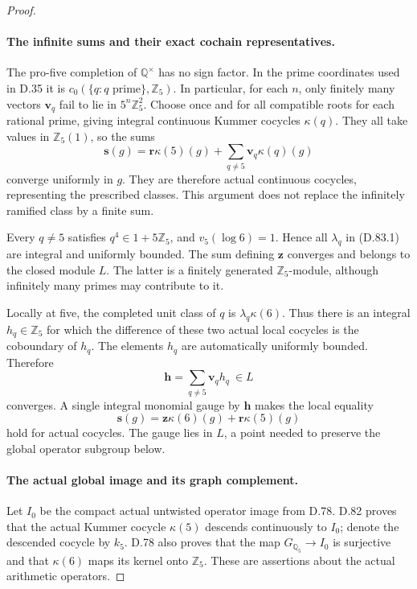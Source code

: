 \begin{proof}
\paragraph{The infinite sums and their exact cochain representatives.}
The pro-five completion of \(\mathbb Q^\times\) has no sign factor.
In the prime coordinates used in D.35 it is
\(c_0(\{q:q\text{ prime}\},\mathbb Z_5)\). In particular, for
each \(n\), only finitely many vectors \(\mathbf v_q\) fail to
lie in \(5^n\mathbb Z_5^2\). Choose once and for all compatible
roots for each rational prime, giving integral continuous
Kummer cocycles \(\kappa(q)\). They all take values in
\(\mathbb Z_5(1)\), so the sums
\[
 \mathbf s(g)=\mathbf r\kappa(5)(g)
           +\sum_{q\ne5}\mathbf v_q\kappa(q)(g)                 \tag{D.83.7}
\]
converge uniformly in \(g\). They are therefore actual continuous
cocycles, representing the prescribed classes. This argument
does not replace the infinitely ramified class by a finite sum.

Every \(q\ne5\) satisfies \(q^4\in1+5\mathbb Z_5\), and
\(v_5(\log6)=1\). Hence all \(\lambda_q\) in (D.83.1)
are integral and uniformly bounded. The sum defining
\(\mathbf z\) converges and belongs to the closed module \(L\).
The latter is a finitely generated \(\mathbb Z_5\)-module,
although infinitely many primes may contribute to it.

Locally at five, the completed unit class of \(q\) is
\(\lambda_q\kappa(6)\). Thus there is an integral
\(h_q\in\mathbb Z_5\) for which the difference of these two
actual local cocycles is the coboundary of \(h_q\).
The elements \(h_q\) are automatically uniformly bounded.
Therefore
\[
                       \mathbf h=\sum_{q\ne5}\mathbf v_qh_q
                                  \ \in L                       \tag{D.83.8}
\]
converges. A single integral monomial gauge by \(\mathbf h\)
makes the local equality
\[
              \mathbf s(g)=\mathbf z\kappa(6)(g)
                                +\mathbf r\kappa(5)(g)          \tag{D.83.9}
\]
hold for actual cocycles. The gauge lies in \(L\), a point
needed to preserve the global operator subgroup below.

\paragraph{The actual global image and its graph complement.}
Let \(I_0\) be the compact actual untwisted operator image from
D.78. D.82 proves that the actual Kummer cocycle \(\kappa(5)\)
descends continuously to \(I_0\); denote the descended cocycle
by \(k_5\). D.78 also proves that the map
\(G_{\mathbb Q_5}\to I_0\) is surjective and that
\(\kappa(6)\) maps its kernel onto \(\mathbb Z_5\).
These are assertions about the actual arithmetic operators.


\end{proof}
